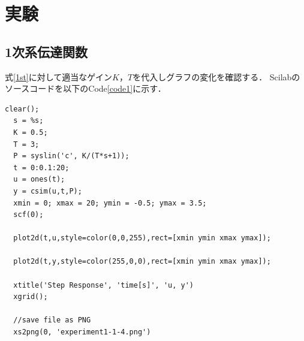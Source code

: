 \documentclass[a4paper,11pt]{jsarticle}
\begin{document}
    
\section{実験}
  \subsection{1次系伝達関数}
    式\ref{1st}に対して適当なゲイン$K$，$T$を代入しグラフの変化を確認する．
    Scilabのソースコードを以下のCode\ref{code1}に示す．~\cite{text}\\

    \begin{lstlisting}[caption=1次系伝達関数のソースコード, label=code1]
  clear();
  s = %s;
  K = 0.5;
  T = 3;
  P = syslin('c', K/(T*s+1));
  t = 0:0.1:20;
  u = ones(t);
  y = csim(u,t,P);
  xmin = 0; xmax = 20; ymin = -0.5; ymax = 3.5;
  scf(0);

  plot2d(t,u,style=color(0,0,255),rect=[xmin ymin xmax ymax]);

  plot2d(t,y,style=color(255,0,0),rect=[xmin ymin xmax ymax]);

  xtitle('Step Response', 'time[s]', 'u, y')
  xgrid();

  //save file as PNG
  xs2png(0, 'experiment1-1-4.png')

    \end{lstlisting}
\end{document}
